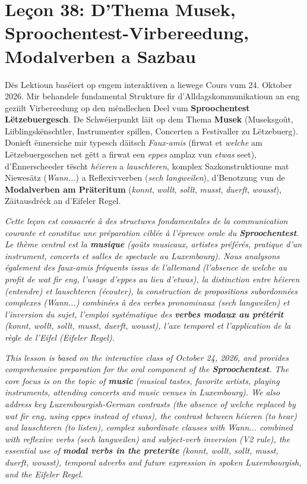 \chapter[Leçon 38: D'Thema Musek, Modalverben a Sazbau]{Leçon 38: D'Thema Musek, Sproochentest-Virbereedung, Modalverben a Sazbau}

Dës Lektioun baséiert op engem interaktiven a liewege Cours vum 24. Oktober 2026. Mir behandele fundamental Strukture fir d'Alldagskommunikatioun an eng geziilt Virbereedung op den mëndlechen Deel vum \textbf{Sproochentest Lëtzebuergesch}. De Schwéierpunkt läit op dem Thema \textbf{Musek} (Museksgoût, Liiblingskënschtler, Instrumenter spillen, Concerten a Festivaller zu Lëtzebuerg). Donieft ënnersiche mir typesch däitsch \textit{Faux-amis} (firwat et \textit{welche} am Lëtzebuergeschen net gëtt a firwat een \textit{eppes} amplaz vun \textit{etwas} seet), d'Ënnerscheeder tëscht \textit{héieren} a \textit{lauschteren}, komplex Sazkonstruktioune mat Niewesätz (\textit{Wann...}) a Reflexivverben (\textit{sech langweilen}), d'Benotzung vun de \textbf{Modalverben am Präteritum} (\textit{konnt}, \textit{wollt}, \textit{sollt}, \textit{musst}, \textit{duerft}, \textit{wousst}), Zäitausdréck an d'Eifeler Regel.

\textit{Cette leçon est consacrée à des structures fondamentales de la communication courante et constitue une préparation ciblée à l'épreuve orale du \textbf{Sproochentest}. Le thème central est la \textbf{musique} (goûts musicaux, artistes préférés, pratique d'un instrument, concerts et salles de spectacle au Luxembourg). Nous analysons également des faux-amis fréquents issus de l'allemand (l'absence de \textit{welche} au profit de \textit{wat fir eng}, l'usage d'\textit{eppes} au lieu d'\textit{etwas}), la distinction entre \textit{héieren} (entendre) et \textit{lauschteren} (écouter), la construction de propositions subordonnées complexes (\textit{Wann...}) combinées à des verbes pronominaux (\textit{sech langweilen}) et l'inversion du sujet, l'emploi systématique des \textbf{verbes modaux au prétérit} (\textit{konnt}, \textit{wollt}, \textit{sollt}, \textit{musst}, \textit{duerft}, \textit{wousst}), l'axe temporel et l'application de la règle de l'Eifel (\textit{Eifeler Regel}).}

\textit{This lesson is based on the interactive class of October 24, 2026, and provides comprehensive preparation for the oral component of the \textbf{Sproochentest}. The core focus is on the topic of \textbf{music} (musical tastes, favorite artists, playing instruments, attending concerts and music venues in Luxembourg). We also address key Luxembourgish-German contrasts (the absence of \textit{welche} replaced by \textit{wat fir eng}, using \textit{eppes} instead of \textit{etwas}), the contrast between \textit{héieren} (to hear) and \textit{lauschteren} (to listen), complex subordinate clauses with \textit{Wann...} combined with reflexive verbs (\textit{sech langweilen}) and subject-verb inversion (V2 rule), the essential use of \textbf{modal verbs in the preterite} (\textit{konnt}, \textit{wollt}, \textit{sollt}, \textit{musst}, \textit{duerft}, \textit{wousst}), temporal adverbs and future expression in spoken Luxembourgish, and the Eifeler Regel.}

